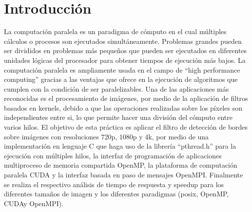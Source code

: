 





\maketitle



\section{Introducción}
La computación paralela es un paradigma de cómputo en el cual múltiples cálculos o procesos son ejecutados simultáneamente. Problemas grandes pueden ser divididos en problemas más pequeños que pueden ser ejecutados en diferentes unidades lógicas del procesador para obtener tiempos de ejecución más bajos. La computación paralela es ampliamente usada en el campo de ``high performance computing'' gracias a las ventajas que ofrece en la ejecución de algoritmos que cumplen con la condición de ser paralelizables. Una de las aplicaciones más reconocidas es el procesamiento de imágenes, por medio de la aplicación de filtros basados en kernels, debido a que las operaciones realizadas sobre los píxeles son independientes entre si, lo que permite hacer una división del cómputo entre varios hilos. El objetivo de esta práctica es aplicar el filtro de detección de bordes sobre imágenes con resoluciones 720p, 1080p y 4k, por medio de una implementación en lenguaje C que haga uso de la librería ``pthread.h'' para la ejecución con múltiples hilos, la interfaz de programación de aplicaciones multiproceso de memoria compartida OpenMP, la plataforma de computación paralela CUDA y la interfaz basada en paso de mensajes OpenMPI. Finalmente se realiza el respectivo análisis de tiempo de respuesta y speedup para los diferentes tamaños de imagen y los diferentes paradigmas (posix, OpenMP, CUDAy OpenMPI).

